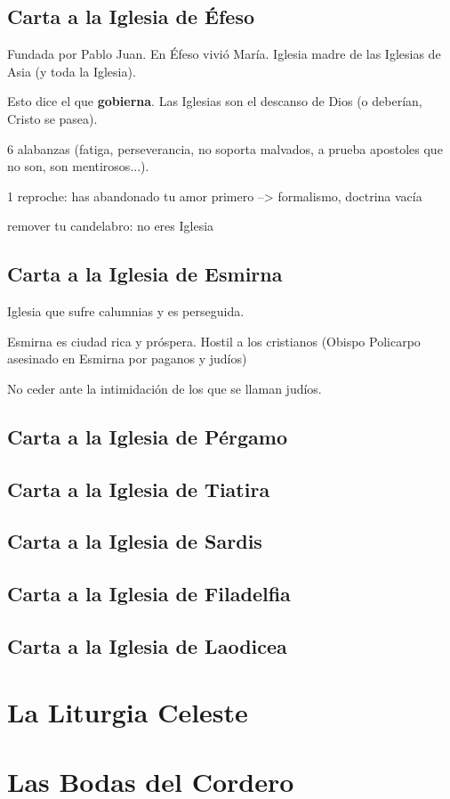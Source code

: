 \documentclass[11pt, oneside, titlepage]{book}
\begin{document}
    \subsection{Carta a la Iglesia de Éfeso}

        Fundada por Pablo Juan. En Éfeso vivió María. Iglesia madre de las Iglesias de Asia (y toda la Iglesia).

        Esto dice el que \textbf{gobierna}. Las Iglesias son el descanso de Dios (o deberían, Cristo se pasea).

        6 alabanzas (fatiga, perseverancia, no soporta malvados, a prueba apostoles que no son, son mentirosos...).

        1 reproche: has abandonado tu amor primero --> formalismo, doctrina vacía

        remover tu candelabro: no eres Iglesia

    \subsection{Carta a la Iglesia de Esmirna}

        Iglesia que sufre calumnias y es perseguida.

        Esmirna es ciudad rica y próspera. Hostil a los cristianos (Obispo Policarpo asesinado en Esmirna por paganos y judíos)

        No ceder ante la intimidación de los que se llaman judíos.

    \subsection{Carta a la Iglesia de Pérgamo}
    \subsection{Carta a la Iglesia de Tiatira}
    \subsection{Carta a la Iglesia de Sardis}
    \subsection{Carta a la Iglesia de Filadelfia}
    \subsection{Carta a la Iglesia de Laodicea}

    \section{La Liturgia Celeste}
    \section{Las Bodas del Cordero}

\end{document}
